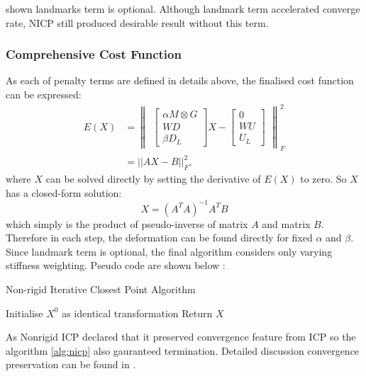 \cite{Amberg2007} shown landmarks term is optional. Although landmark term accelerated converge rate, NICP still produced desirable result without this term.

\subsubsection{Comprehensive Cost Function}
As each of penalty terms are defined in details above, the finalised cost function can be expressed:
\begin{align}
\label{eq:nicpfinal}
E(X) &= 
\begin{Vmatrix}
    \begin{bmatrix}
        \alpha M \otimes G \\ WD \\ \beta D_L
    \end{bmatrix}
    X- 
    \begin{bmatrix}
        0 \\ WU \\ U_L
    \end{bmatrix}
\end{Vmatrix}
^2_F \\
&= ||AX-B||^2_F,
\end{align}
where $X$ can be solved directly by setting the derivative of $E(X)$ to zero. So $X$ has a closed-form solution:
\begin{equation}
\label{eq:nicpx}
X=(A^TA)^{-1}A^TB
\end{equation}
which simply is the product of pseudo-inverse of matrix $A$ and matrix $B$. Therefore in each step, the deformation can be found directly for fixed $\alpha$ and $\beta$. Since landmark term is optional, the final algorithm considers only varying stiffness weighting. Pseudo code are shown below \cite{Amberg2007}:
\begin{algorithm}[ht]
\caption{Non-rigid Iterative Closest Point Algorithm}
\label{alg:nicp}
Initialise $X^0$ as identical transformation\;
Return $X$\;
\end{algorithm}

As Nonrigid ICP declared that it preserved convergence feature from ICP so the algorithm \ref{alg:nicp} also gauranteed termination. Detailed discussion convergence preservation can be found in \cite{Amberg2007}.